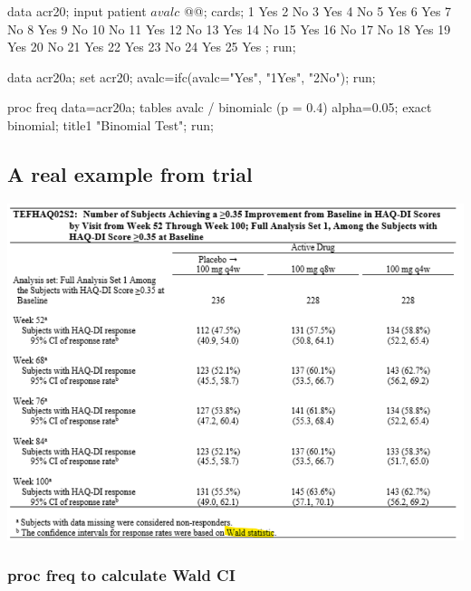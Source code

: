 \documentclass[
]{book}
\newenvironment{Shaded}{\begin{snugshade}}{\end{snugshade}}
\newcommand{\BaseNTok}[1]{\textcolor[rgb]{0.00,0.00,0.81}{#1}}
\newcommand{\NormalTok}[1]{#1}
\begin{document}
\begin{Shaded}
\begin{Highlighting}[]
\NormalTok{data acr20;}
\BaseNTok{    input patient $ avalc $ @@;}
\BaseNTok{    cards;}
\BaseNTok{    1 Yes 2 No}
\BaseNTok{    3 Yes 4 No}
\BaseNTok{    5 Yes 6 Yes}
\BaseNTok{    7 No  8 Yes}
\BaseNTok{    9 No  10 No}
\BaseNTok{    11 Yes 12 No}
\BaseNTok{    13 Yes 14 No}
\BaseNTok{    15 Yes 16 No}
\BaseNTok{    17 No  18 Yes}
\BaseNTok{    19 Yes 20 No}
\BaseNTok{    21 Yes 22 Yes}
\BaseNTok{    23 No 24 Yes}
\BaseNTok{    25 Yes}
\BaseNTok{    ;}
\NormalTok{run;}

\NormalTok{data acr20a;}
\BaseNTok{    set acr20;}
\BaseNTok{    avalc=ifc(avalc="Yes", "1Yes", "2No");}
\NormalTok{run;}

\NormalTok{proc freq data=acr20a;}
\BaseNTok{    tables avalc / binomialc (p = 0.4) alpha=0.05;}
\BaseNTok{    exact binomial;}
\BaseNTok{    title1 "Binomial Test";}
\NormalTok{run;}
\end{Highlighting}
\end{Shaded}

\hypertarget{a-real-example-from-trial}{%
\subsection{A real example from trial}\label{a-real-example-from-trial}}

\includegraphics[width=13.01in]{images/wald_ci}

\hypertarget{proc-freq-to-calculate-wald-ci-1}{%
\subsubsection{proc freq to calculate Wald CI}\label{proc-freq-to-calculate-wald-ci-1}}
\end{document}

